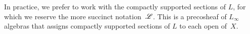 \documentclass[10pt]{amsart}
\def\sAd{\sA{\rm d}}
\def\owen{\textcolor{magenta}{OG: }\textcolor{magenta}}
\begin{document}
In practice, we prefer to work with the compactly supported sections of $L$, for which we reserve the more succinct notation~$\mathscr L$.
This is a precosheaf of $L_\infty$ algebras that assigns compactly supported sections of $L$ to each open of~$X$.

%
%
% 
%
%
%
\end{document}
